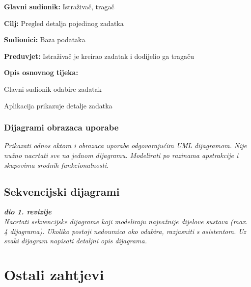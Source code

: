 					\noindent {}
					\begin{packed_item}
						
						\item \textbf{Glavni sudionik:} Istraživač, tragač
						\item  \textbf{Cilj:} Pregled detalja pojedinog zadatka
						\item  \textbf{Sudionici:} Baza podataka
						\item  \textbf{Preduvjet:} Istraživač je kreirao zadatak i dodijelio ga tragaču
						\item  \textbf{Opis osnovnog tijeka:}
						
						\item[] \begin{packed_enum}
							
							\item Glavni sudionik odabire zadatak
							\item Aplikacija prikazuje detalje zadatka
						\end{packed_enum}
					\end{packed_item}
					

				\subsubsection{Dijagrami obrazaca uporabe}
					
					\textit{Prikazati odnos aktora i obrazaca uporabe odgovarajućim UML dijagramom. Nije nužno nacrtati sve na jednom dijagramu. Modelirati po razinama apstrakcije i skupovima srodnih funkcionalnosti.}
				\eject		
				
			\subsection{Sekvencijski dijagrami}
				
				\textbf{\textit{dio 1. revizije}}\\
				
				\textit{Nacrtati sekvencijske dijagrame koji modeliraju najvažnije dijelove sustava (max. 4 dijagrama). Ukoliko postoji nedoumica oko odabira, razjasniti s asistentom. Uz svaki dijagram napisati detaljni opis dijagrama.}
				\eject
	
		\section{Ostali zahtjevi}
		
